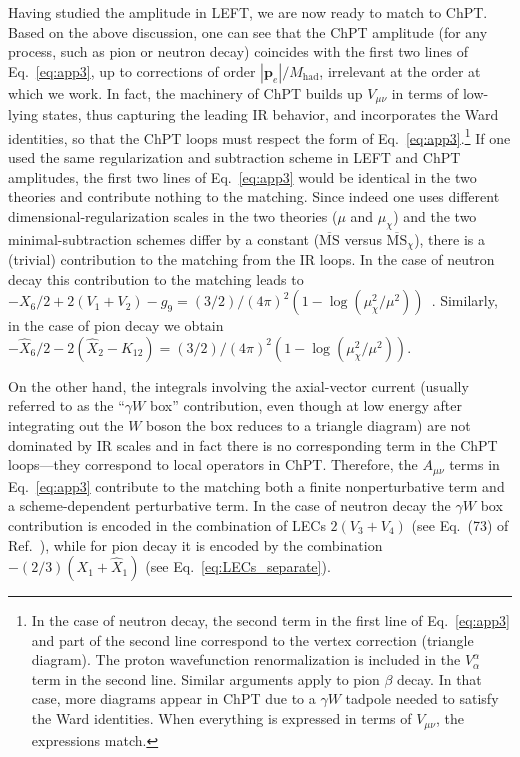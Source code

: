 \documentclass[prl,twocolumn,twoside,preprintnumbers,superscriptaddress,nofootinbib,letterpaper]{revtex4-1}
\newcommand{\Mhad}{M_\text{had}}
\begin{document}
Having studied the amplitude in LEFT, we are now ready to match to ChPT.
Based on the above discussion,  one can see  that  the ChPT amplitude (for any process, such as   pion or neutron decay)   coincides  with the
first two lines of Eq.~\eqref{eq:app3}, up to corrections of order $|\mathbf{p}_e|/\Mhad$, irrelevant at the order at which we work.
In fact,  the machinery of  ChPT builds up $V_{\mu \nu}$ in terms of low-lying states, thus capturing the leading IR behavior,
and incorporates the Ward identities, so that the ChPT  loops must respect the form of  Eq.~\eqref{eq:app3}.\footnote{In the case of neutron decay,
the second term in the first line of Eq.~\eqref{eq:app3} and part of the second line correspond to the  vertex correction (triangle diagram).
The proton wavefunction renormalization is included in the $V^\alpha_\alpha$ term in the second line.
Similar arguments apply to pion $\beta$ decay. In that case, more diagrams  appear in ChPT due to a $\gamma W$ tadpole needed to satisfy the
Ward identities. When everything is expressed in terms of $V_{\mu \nu}$, the expressions match.}
If one  used the same regularization and subtraction  scheme  in LEFT and ChPT amplitudes, the  first two lines of Eq.~\eqref{eq:app3}
would be identical in the two theories and contribute nothing to the matching.
Since indeed one uses different dimensional-regularization   scales in the two theories ($\mu$ and $\mu_\chi$) and the
two minimal-subtraction schemes differ by a constant ($\overline{\text{MS}}$ versus  $\overline{\text{MS}}_\chi$),
there is a (trivial) contribution to the matching from the IR loops.
In the case of neutron decay this contribution to the matching leads to
$-X_6/2 + 2 (V_1 + V_2) - g_9 = (3/2)/(4\pi)^2 (1 - \log (\mu_\chi^2/\mu^2))$~\cite{Cirigliano:2023fnz}.
Similarly, in the case of pion decay we obtain  $-\hat X_6/2 -2 (\hat X_2 - K_{12}) = (3/2)/(4\pi)^2 (1 - \log (\mu_\chi^2/\mu^2))$.

On the other hand, the integrals involving the axial-vector current
(usually referred to as the ``$\gamma W$ box'' contribution, even though at low energy
after integrating out the $W$ boson  the box reduces to a triangle diagram)
are not dominated by IR scales and in fact there is no corresponding term  in the ChPT loops---they correspond to local operators in ChPT.
Therefore, the $A_{\mu \nu}$ terms in Eq.~\eqref{eq:app3} contribute to the matching both a finite nonperturbative term and
a scheme-dependent perturbative term.
In the case of neutron decay the $\gamma W$ box contribution is encoded
in the combination of LECs $2(V_3 + V_4)$ (see  Eq.~(73) of Ref.~\cite{Cirigliano:2023fnz}),
while for pion decay it is encoded by the combination $-(2/3) (X_1 +  \hat X_1)$
(see Eq.~\eqref{eq:LECs_separate}).
\end{document}
